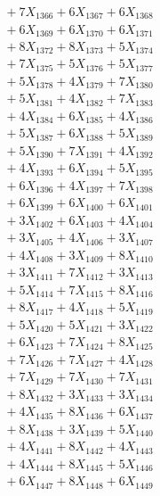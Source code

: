 \documentclass[a4paper,10pt]{article}
\begin{document}
{\begin{align}
&\;  + 7 X_{1366} + 6 X_{1367} + 6 X_{1368} \\[0.3ex]
&\;  + 6 X_{1369} + 6 X_{1370} + 6 X_{1371} \\[0.3ex]
&\;  + 8 X_{1372} + 8 X_{1373} + 5 X_{1374} \\[0.3ex]
&\;  + 7 X_{1375} + 5 X_{1376} + 5 X_{1377} \\[0.3ex]
&\;  + 5 X_{1378} + 4 X_{1379} + 7 X_{1380} \\[0.3ex]
&\;  + 5 X_{1381} + 4 X_{1382} + 7 X_{1383} \\[0.3ex]
&\;  + 4 X_{1384} + 6 X_{1385} + 4 X_{1386} \\[0.3ex]
&\;  + 5 X_{1387} + 6 X_{1388} + 5 X_{1389} \\[0.5ex]\allowbreak
&\;  + 5 X_{1390} + 7 X_{1391} + 4 X_{1392} \\[0.3ex]
&\;  + 4 X_{1393} + 6 X_{1394} + 5 X_{1395} \\[0.3ex]
&\;  + 6 X_{1396} + 4 X_{1397} + 7 X_{1398} \\[0.3ex]
&\;  + 6 X_{1399} + 6 X_{1400} + 6 X_{1401} \\[0.3ex]
&\;  + 3 X_{1402} + 6 X_{1403} + 4 X_{1404} \\[0.3ex]
&\;  + 3 X_{1405} + 4 X_{1406} + 3 X_{1407} \\[0.3ex]
&\;  + 4 X_{1408} + 3 X_{1409} + 8 X_{1410} \\[0.3ex]
&\;  + 3 X_{1411} + 7 X_{1412} + 3 X_{1413} \\[0.3ex]
&\;  + 5 X_{1414} + 7 X_{1415} + 8 X_{1416} \\[0.3ex]
&\;  + 8 X_{1417} + 4 X_{1418} + 5 X_{1419} \\[0.5ex]\allowbreak
&\;  + 5 X_{1420} + 5 X_{1421} + 3 X_{1422} \\[0.3ex]
&\;  + 6 X_{1423} + 7 X_{1424} + 8 X_{1425} \\[0.3ex]
&\;  + 7 X_{1426} + 7 X_{1427} + 4 X_{1428} \\[0.3ex]
&\;  + 7 X_{1429} + 7 X_{1430} + 7 X_{1431} \\[0.3ex]
&\;  + 8 X_{1432} + 3 X_{1433} + 3 X_{1434} \\[0.3ex]
&\;  + 4 X_{1435} + 8 X_{1436} + 6 X_{1437} \\[0.3ex]
&\;  + 8 X_{1438} + 3 X_{1439} + 5 X_{1440} \\[0.3ex]
&\;  + 4 X_{1441} + 8 X_{1442} + 4 X_{1443} \\[0.3ex]
&\;  + 4 X_{1444} + 8 X_{1445} + 5 X_{1446} \\[0.3ex]
&\;  + 6 X_{1447} + 8 X_{1448} + 6 X_{1449} \\[0.5ex]\allowbreak

\end{align}}
\end{document}
